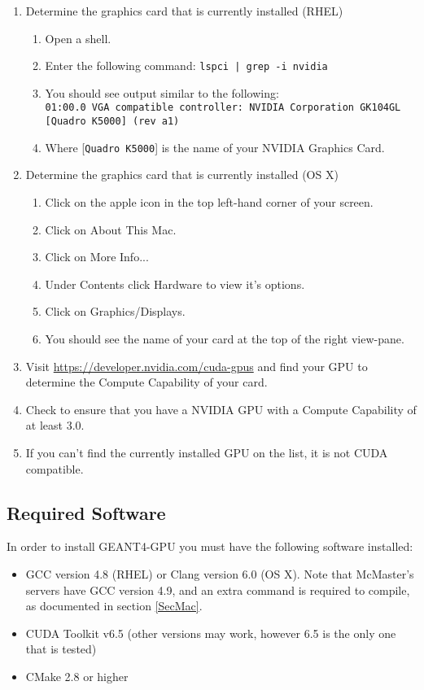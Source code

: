 \documentclass[12pt]{article}
\begin{document}
\begin{enumerate}
\item Determine the graphics card that is currently installed (RHEL)
\begin{enumerate}
\item Open a shell.
\item Enter the following command: \texttt{lspci | grep -i nvidia}
\item You should see output similar to the following:\\
\texttt{01:00.0 VGA compatible controller: NVIDIA Corporation GK104GL}\\
\texttt{[Quadro K5000] (rev a1)}
\item Where [\texttt{Quadro K5000}] is the name of your NVIDIA Graphics Card.
\end{enumerate}

\item Determine the graphics card that is currently installed (OS X)
\begin{enumerate}
\item Click on the apple icon in the top left-hand corner of your screen.
\item Click on About This Mac.
\item Click on More Info...
\item Under Contents click Hardware to view it's options.
\item Click on Graphics/Displays.
\item You should see the name of your card at the top of the right view-pane.
\end{enumerate}

\item Visit \url{https://developer.nvidia.com/cuda-gpus} and find your GPU to determine the Compute Capability of your card.
\item Check to ensure that you have a NVIDIA GPU with a  Compute Capability of at least 3.0.
\item If you can't find the currently installed GPU on the list, it is not CUDA compatible.
\end{enumerate}

\subsection{Required Software} %
In order to install GEANT4-GPU you must have the following software installed:
\begin{itemize}
\item GCC version 4.8 (RHEL) or Clang version 6.0 (OS X). Note that McMaster's servers have GCC version 4.9, and an extra command is required to compile, as documented in section \ref{SecMac}.
\item CUDA Toolkit v6.5 (other versions may work, however 6.5 is the only one that is tested)
\item CMake 2.8 or higher
\end{itemize}
\end{document}
